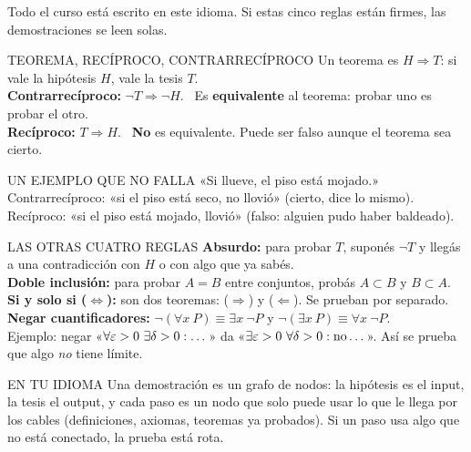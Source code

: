 Todo el curso está escrito en este idioma. Si estas cinco reglas están firmes, las demostraciones se leen solas.

\apuntes
\begin{sello}{TEOREMA, RECÍPROCO, CONTRARRECÍPROCO}
Un teorema es $H\Rightarrow T$: si vale la hipótesis $H$, vale la tesis $T$.\\[3pt]
\textbf{Contrarrecíproco:} $\neg T\Rightarrow\neg H$. \ Es \textbf{equivalente} al teorema: probar uno es probar el otro.\\[3pt]
\textbf{Recíproco:} $T\Rightarrow H$. \ \textbf{No} es equivalente. Puede ser falso aunque el teorema sea cierto.
\end{sello}
\begin{tip}{UN EJEMPLO QUE NO FALLA}
«Si llueve, el piso está mojado.» Contrarrecíproco: «si el piso está seco, no llovió» (cierto, dice lo mismo). Recíproco: «si el piso está mojado, llovió» (falso: alguien pudo haber baldeado).
\end{tip}

\agregado
\begin{memo}{LAS OTRAS CUATRO REGLAS}
\textbf{Absurdo:} para probar $T$, suponés $\neg T$ y llegás a una contradicción con $H$ o con algo que ya sabés.\\[2pt]
\textbf{Doble inclusión:} para probar $A=B$ entre conjuntos, probás $A\subset B$ y $B\subset A$.\\[2pt]
\textbf{Si y solo si ($\iff$):} son dos teoremas: ($\Rightarrow$) y ($\Leftarrow$). Se prueban por separado.\\[2pt]
\textbf{Negar cuantificadores:} $\neg(\forall x\ P)\equiv\exists x\ \neg P$ \quad y \quad $\neg(\exists x\ P)\equiv\forall x\ \neg P$.\\
Ejemplo: negar «$\forall\eps>0\ \exists\delta>0: \dots$» da «$\exists\varepsilon>0\ \forall\delta>0: \text{no}\dots$». Así se prueba que algo \emph{no} tiene límite.
\end{memo}
\begin{tip}{EN TU IDIOMA}
Una demostración es un grafo de nodos: la hipótesis es el input, la tesis el output, y cada paso es un nodo que solo puede usar lo que le llega por los cables (definiciones, axiomas, teoremas ya probados). Si un paso usa algo que no está conectado, la prueba está rota.
\end{tip}
